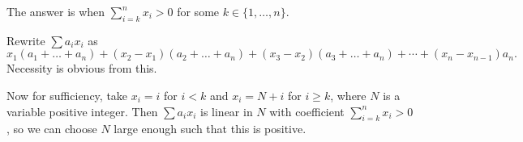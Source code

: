 The answer is when $\displaystyle\sum_{i=k}^nx_i>0$ for some $k\in\{1,\ldots,n\}$.

Rewrite $\sum a_ix_i$ as \[x_1(a_1+\ldots+a_n)+(x_2-x_1)(a_2+\ldots+a_n)+(x_3-x_2)(a_3+\ldots+a_n)+\cdots+(x_n-x_{n-1})a_n.\] Necessity is obvious from this.

Now for sufficiency, take $x_i=i$ for $i<k$ and $x_i=N+i$ for $i\geq k$, where $N$ is a variable positive integer. Then $\sum a_ix_i$ is linear in $N$ with coefficient $\displaystyle\sum_{i=k}^nx_i>0$, so we can choose $N$ large enough such that this is positive.